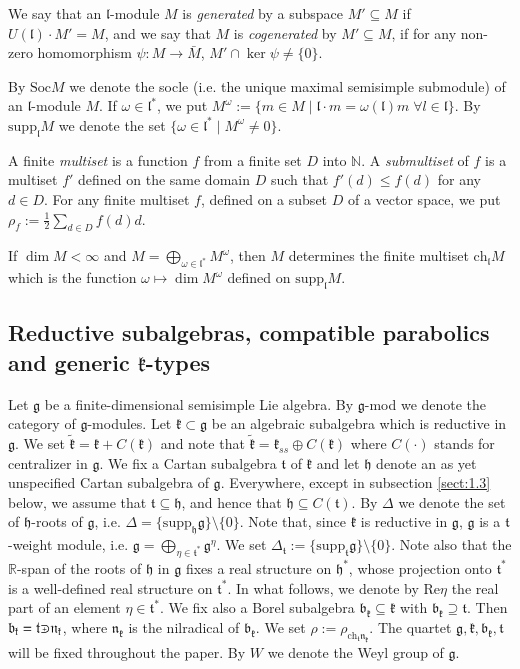 \documentclass[default]{./styles/svmult}
\newcommand{\supp}{\mathrm{supp}}
\newcommand{\ch}{\mathrm{ch}}
\newcommand{\Soc}{\mathrm{Soc}}
\newcommand{\field}[1]{\mathbb{#1}}
\newcommand{\bb}{\mathfrak{b}}
\renewcommand{\gg}{\mathfrak{g}}
\newcommand{\hh}{\mathfrak{h}}
\newcommand{\kk}{\mathfrak{k}}
\renewcommand{\ll}{\mathfrak{l}}
\newcommand{\nn}{\mathfrak{n}}
\renewcommand{\tt}{\mathfrak{t}}
\def\crplus{\hbox{$\supset${\raise1.05pt\hbox{\kern -0.55em ${\scriptscriptstyle +}$}}\ }}
\begin{document}
We say that an $\ll$-module $M$ is \textit{generated} by a subspace $M'\subseteq M$ if $U(\ll)\cdot M'=M$, and we say that $M$ is \textit{cogenerated} by $M'\subseteq M$, if for any non-zero homomorphism $\psi :M\rightarrow\bar{M}$, $M'\cap\ker\psi\neq\{0\}$. 

By $\Soc M$ we denote the socle (i.e. the unique maximal semisimple submodule) of an $\ll$-module $M$. If $\omega\in\ll^*$, we put $M^\omega:=\{m\in M\; |\; \ll\cdot m=\omega(\ll)m \;\forall l \in\ll\}$. By $\supp_\ll M$ we denote the set $\{\omega\in\ll^*\; |\; M^\omega\neq 0\}$.

A finite \textit{multiset} is a function $f$ from a finite set $D$ into $\field{N}$. A \textit{submultiset} of $f$ is a multiset $f'$ defined on the same domain $D$ such that $f'(d)\leq f(d)$ for any $d\in D$. For any finite multiset $f$, defined on a subset $D$ of a vector space, we put $\rho_f:=\frac{1}{2}\sum_{d\in D}f(d)d$.

If $\dim M<\infty$ and $M=\bigoplus_{\omega\in\ll^*}M^\omega$, then $M$ determines the finite multiset $\ch_{\ll}M$ which is the function $\omega\mapsto\dim M^\omega$ defined on $\supp_{\ll}M$.

\subsection{Reductive subalgebras, compatible parabolics and generic $\kk$-types}\label{sect:1.2}

Let $\gg$ be a finite-dimensional semisimple Lie algebra. By $\gg$-mod we denote the category of $\gg$-modules. Let $\kk\subset\gg$ be an algebraic subalgebra which is reductive in $\gg$. We set $\tilde{\kk} = \kk + C(\kk)$ and note that $\tilde{\kk}=\kk_{ss} \oplus C(\kk)$ where $C(\cdot)$ stands for centralizer in $\gg$. We fix a Cartan subalgebra $\tt$ of $\kk$ and let $\hh$ denote an as yet unspecified Cartan subalgebra of $\gg$. Everywhere, except in subsection \ref{sect:1.3} below, we assume that $\tt \subseteq \hh$, and hence that $\hh \subseteq C(\tt)$. By $\Delta$ we denote the set of $\hh$-roots of $\gg$, i.e. $\Delta=\{\supp_\hh\gg\}\setminus\{0\}$. Note that, since $\kk$ is reductive in $\gg$, $\gg$ is a $\tt$-weight module, i.e. $\gg=\bigoplus_{\eta\in\tt^*}\gg^\eta$. We set $\Delta_\tt:=\{\supp_\tt\gg\}\setminus\{0\}$. Note also that the $\field{R}$-span of the roots of $\hh$ in $\gg$ fixes a real structure on $\hh^*$, whose projection onto $\tt^*$ is a well-defined real structure on $\tt^*$. 
In 
what follows, 
we 
denote by $\mathrm{Re}\eta$ the real part of an 
element $\eta\in\tt^*$. We fix also a Borel subalgebra $\bb_\kk\subseteq\kk$ with $\bb_\kk\supseteq\tt$. Then $\bb_\kk=\tt\crplus\nn_\kk$, where $\nn_\kk$ is the nilradical of $\bb_\kk$. We set $\rho:=\rho_{\ch_\tt\nn_\kk}$. The quartet $\gg,\kk,\bb_\kk,\tt$ will be fixed throughout the paper. By $W$ we denote the Weyl group of $\gg$.
\end{document}
